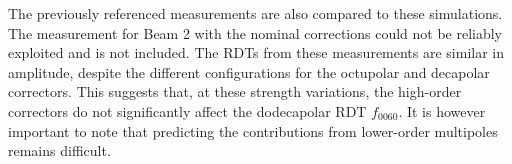 The previously referenced measurements are also compared to these simulations. The measurement for
Beam 2 with the nominal corrections could not be reliably exploited and is not included.  The RDTs
from these measurements are similar in amplitude, despite the different configurations for the
octupolar and decapolar correctors. This suggests that, at these strength variations, the high-order
correctors do not significantly affect the dodecapolar RDT $f_{0060}$. It is however important to
note that predicting the contributions from lower-order multipoles remains difficult.